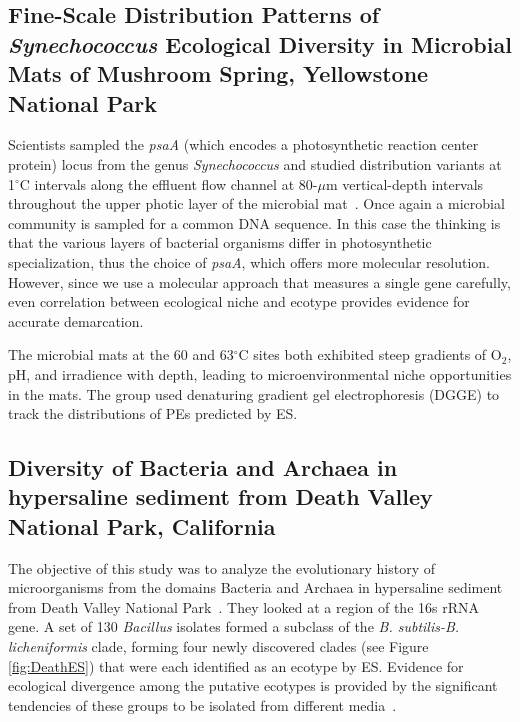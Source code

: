 \subsection*{Fine-Scale Distribution Patterns of \emph{Synechococcus} Ecological Diversity in Microbial Mats of Mushroom Spring, Yellowstone National Park}
Scientists sampled the \emph{psaA} (which encodes a photosynthetic reaction center protein) locus from the genus \emph{Synechococcus} and studied distribution variants at 1$^\circ$C intervals along the effluent flow channel at 80-$\mu$m vertical-depth intervals throughout the upper photic layer of the microbial mat~\cite{becraft2011fine}.
Once again a microbial community is sampled for a common DNA sequence.
In this case the thinking is that the various layers of bacterial organisms differ in photosynthetic specialization, thus the choice of \emph{psaA}, which offers more molecular resolution.
However, since we use a molecular approach that measures a single gene carefully, even correlation between ecological niche and ecotype provides evidence for accurate demarcation.

The microbial mats at the 60 and 63$^\circ$C sites both exhibited steep gradients of O$_2$, pH, and irradience with depth, leading to microenvironmental niche opportunities in the mats.
The group used denaturing gradient gel electrophoresis (DGGE) to track the distributions of PEs predicted by ES.

\subsection*{Diversity of Bacteria and Archaea in hypersaline sediment from Death Valley National Park, California}
The objective of this study was to analyze the evolutionary history of microorganisms from the domains Bacteria and Archaea in hypersaline sediment from Death Valley National Park~\cite{kim2012diversity}. 
They looked at a region of the 16s rRNA gene.
A set of 130 \emph{Bacillus} isolates formed a subclass of the \emph{B. subtilis-B. licheniformis} clade, forming four newly discovered clades (see Figure \ref{fig:DeathES}) that were each identified as an ecotype by ES. Evidence for ecological divergence among the putative ecotypes is provided by the significant tendencies of these groups to be isolated from different media~\cite{kim2012diversity}.

